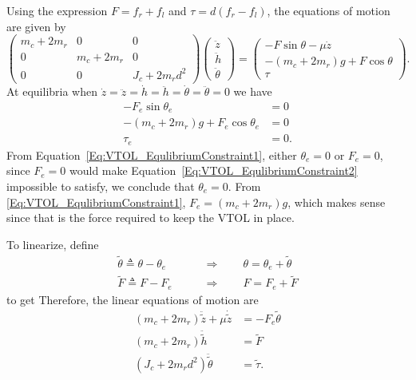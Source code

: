 \documentclass{article}
\begin{document}
Using the expression $F = f_r + f_l$ and $\tau = d (f_r - f_l)$, the equations of motion are given by
\begin{equation*}
\begin{pmatrix}
m_c + 2 m_r & 0           & 0 \\
0           & m_c + 2 m_r & 0 \\
0           & 0           & J_c + 2 m_r d^2
\end{pmatrix}
\begin{pmatrix}
\ddot{z} \\
\ddot{h} \\
\ddot{\theta}
\end{pmatrix}
=
\begin{pmatrix}
-F \sin\theta - \mu \dot{z} \\
-(m_c + 2 m_r) g + F \cos\theta \\
\tau
\end{pmatrix}.
\end{equation*}
At equilibria when $\dot{z} = \ddot{z} = \dot{h} = \ddot{h} = \dot{\theta} = \ddot{\theta} = 0$ we have
\begin{align}
- F_e \sin\theta_e &= 0 \label{Eq:VTOL_EqulibriumConstraint1} \\
- \left( m_c + 2 m_r\right) g + F_e\cos\theta_e &= 0 \label{Eq:VTOL_EqulibriumConstraint2} \\
\tau_e &= 0. \label{Eq:VTOL_EqulibriumConstraint3}
\end{align}
From Equation~\eqref{Eq:VTOL_EqulibriumConstraint1}, either $\theta_e = 0$ or $F_e = 0$, since $F_e = 0$ would make Equation~\eqref{Eq:VTOL_EqulibriumConstraint2} impossible to satisfy, we conclude that $\theta_e = 0$.
From \eqref{Eq:VTOL_EqulibriumConstraint1}, $F_e = \left(m_c + 2 m_r\right) g$, which makes sense since that is the force required to keep the VTOL in place.  

To linearize, define
\begin{align*}
\tilde{\theta} \triangleq \theta - \theta_e &\qquad \Rightarrow \qquad \theta = \theta_e + \tilde{\theta} \\
\tilde{F} \triangleq F - F_e &\qquad \Rightarrow \qquad F = F_e + \tilde{F}
\end{align*}
to get
Therefore, the linear equations of motion are
\begin{align*}
\left( m_c + 2 m_r \right) \ddot{\tilde{z}} + \mu \dot{\tilde{z}} &=  -F_e \tilde{\theta}   \\
\left( m_c + 2 m_r \right) \ddot{\tilde{h}} &= \tilde{F}\\
\left( J_c + 2 m_r d^2 \right) \ddot{\tilde{\theta}} &= \tilde{\tau}.
\end{align*}
\end{document}
